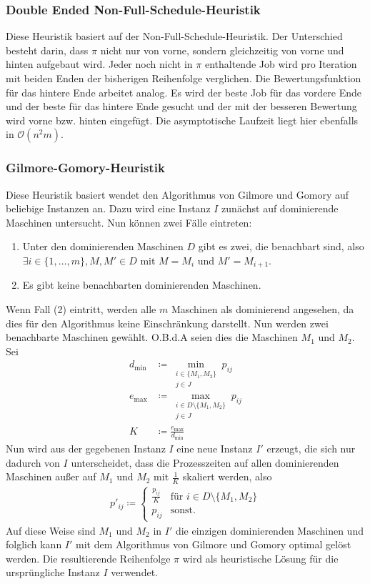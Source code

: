 \documentclass{scrreprt}
\begin{document}
\subsubsection{Double Ended Non-Full-Schedule-Heuristik}
Diese Heuristik basiert auf der Non-Full-Schedule-Heuristik.
Der Unterschied besteht darin, dass $\pi$ nicht nur von vorne, sondern gleichzeitig von vorne und hinten aufgebaut wird.
Jeder noch nicht in $\pi$ enthaltende Job wird pro Iteration mit beiden Enden der bisherigen Reihenfolge verglichen.
Die Bewertungsfunktion für das hintere Ende arbeitet analog.
Es wird der beste Job für das vordere Ende und der beste für das hintere Ende gesucht und der mit der besseren Bewertung wird vorne bzw. hinten eingefügt.
Die asymptotische Laufzeit liegt hier ebenfalls in $\mathcal{O}(n^2m)$.

\subsubsection{Gilmore-Gomory-Heuristik}
Diese Heuristik basiert wendet den Algorithmus von Gilmore und Gomory auf beliebige Instanzen an.
Dazu wird eine Instanz $I$ zunächst auf dominierende Maschinen untersucht.
Nun können zwei Fälle eintreten:
\begin{enumerate}
    \item Unter den dominierenden Maschinen $D$ gibt es zwei, die benachbart sind, also $\exists i\in\{1,\ldots,m\}, M,M'\in D$ mit $M=M_i$ und $M'=M_{i+1}$.
    \item Es gibt keine benachbarten dominierenden Maschinen.
\end{enumerate}
Wenn Fall (2) eintritt, werden alle $m$ Maschinen als dominierend angesehen, da dies für den Algorithmus keine Einschränkung darstellt.
Nun werden zwei benachbarte Maschinen gewählt.
O.B.d.A seien dies die Maschinen $M_1$ und $M_2$. Sei 
\begin{align} 
    d_{\min} &\coloneqq \min_{\substack{i\in \{M_1,M_2\} \\ j\in J}} p_{ij} \\
    e_{\max} &\coloneqq \max_{\substack{i\in D\setminus\{M_1,M_2\} \\ j\in J}} p_{ij} \\
    K &\coloneqq \frac{e_{\max}}{d_{\min}}
\end{align}
Nun wird aus der gegebenen Instanz $I$ eine neue Instanz $I'$ erzeugt, die sich nur dadurch von $I$ unterscheidet, dass die Prozesszeiten
auf allen dominierenden Maschinen außer auf $M_1$ und $M_2$ mit $\frac{1}{K}$ skaliert werden, also
\begin{align}
    p'_{ij} \coloneqq \begin{cases} \frac{p_{ij}}{K} &\text{für } i\in D\setminus\{M_1,M_2\} \\ p_{ij} &\text{sonst.} \end{cases}
\end{align}
Auf diese Weise sind $M_1$ und $M_2$ in $I'$ die einzigen dominierenden Maschinen und folglich kann $I'$ mit dem Algorithmus von Gilmore und Gomory optimal gelöst werden.
Die resultierende Reihenfolge $\pi$ wird als heuristische Lösung für die ursprüngliche Instanz $I$ verwendet.
\end{document}
